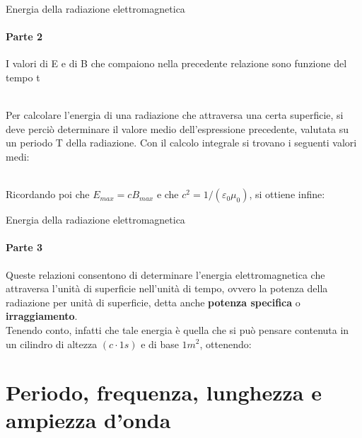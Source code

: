 \documentclass[aspectratio=169]{beamer}
\newcommand*{\vet}{\fontfamily{qzc}\selectfont}
\begin{document}
\begin{frame}{Energia della radiazione elettromagnetica}
	\framesubtitle{Parte 2}
	I valori di {\vet E} e di {\vet B} che compaiono nella precedente relazione sono funzione del tempo {\vet t}\\
	\medskip
	\\ 
	\medskip
	\raggedright{Per calcolare l'energia di una radiazione che attraversa una certa superficie, si deve perciò determinare il valore medio dell'espressione precedente, valutata su un periodo {\vet T} della radiazione. Con il calcolo integrale si trovano i seguenti valori medi:}\\
	\medskip
	\\
	\medskip
	\raggedright{Ricordando poi che $E_{max} = c B_{max}$ e che $c^2 = 1/(\varepsilon_{0} \mu_{0})$, si ottiene infine:}\\
	\medskip
\end{frame}

\begin{frame}{Energia della radiazione elettromagnetica}
	\framesubtitle{Parte 3}
	Queste relazioni consentono di determinare l'energia elettromagnetica che attraversa l'unità di superficie nell'unità di tempo, ovvero la potenza della radiazione per unità di superficie, detta anche \textbf{potenza specifica} o \textbf{irraggiamento}.\\
	Tenendo conto, infatti che tale energia è quella che si può pensare contenuta in un cilindro di altezza $(c \cdot 1 s)$ e di base $1 m^2$, ottenendo: \\
	\medskip
\end{frame}

\section{Periodo, frequenza, lunghezza e ampiezza d'onda}
\begin{frame}
	\\
\end{frame}
\end{document}
